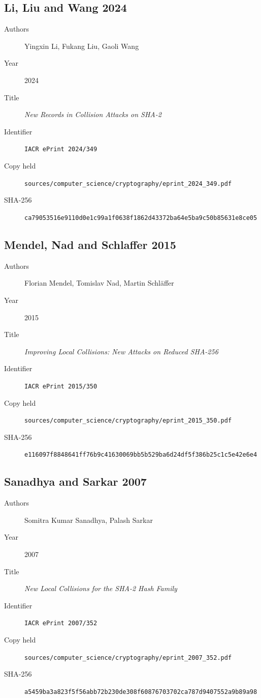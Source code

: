 \subsection*{Li, Liu and Wang 2024}
\begin{description}
\item[Authors] Yingxin Li, Fukang Liu, Gaoli Wang
\item[Year] 2024
\item[Title] \emph{New Records in Collision Attacks on SHA-2}
\item[Identifier] \texttt{IACR ePrint 2024/349}
\item[Copy held] \texttt{sources/computer\_science/cryptography/eprint\_2024\_349.pdf}
\item[SHA-256] {\footnotesize\texttt{ca79053516e9110d0e1c99a1f0638f1862d43372ba64e5ba9c50b85631e8ce05}}
\end{description}

\subsection*{Mendel, Nad and Schlaffer 2015}
\begin{description}
\item[Authors] Florian Mendel, Tomislav Nad, Martin Schläffer
\item[Year] 2015
\item[Title] \emph{Improving Local Collisions: New Attacks on Reduced SHA-256}
\item[Identifier] \texttt{IACR ePrint 2015/350}
\item[Copy held] \texttt{sources/computer\_science/cryptography/eprint\_2015\_350.pdf}
\item[SHA-256] {\footnotesize\texttt{e116097f8848641ff76b9c41630069bb5b529ba6d24df5f386b25c1c5e42e6e4}}
\end{description}

\subsection*{Sanadhya and Sarkar 2007}
\begin{description}
\item[Authors] Somitra Kumar Sanadhya, Palash Sarkar
\item[Year] 2007
\item[Title] \emph{New Local Collisions for the SHA-2 Hash Family}
\item[Identifier] \texttt{IACR ePrint 2007/352}
\item[Copy held] \texttt{sources/computer\_science/cryptography/eprint\_2007\_352.pdf}
\item[SHA-256] {\footnotesize\texttt{a5459ba3a823f5f56abb72b230de308f60876703702ca787d9407552a9b89a98}}
\end{description}

